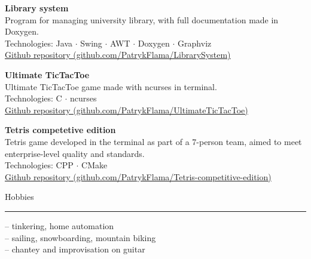 \documentclass{letter}
\begin{document}
\begin{minipage}[t]{0.70\textwidth}
\begin{tcolorbox}[colback=white, colframe=white, width=\textwidth, boxrule=0pt, sharp corners, height=\textheight, left=5mm, right=5mm, top=5mm, bottom=5mm]
{\textbf{Library system}  \\
Program for managing university library, with full documentation made in Doxygen. \\
{\small Technologies: Java $\cdot$ Swing $\cdot$ AWT $\cdot$ Doxygen $\cdot$ Graphviz } \\
{\small \href{https://github.com/PatrykFlama/LibrarySystem}{Github repository (github.com/PatrykFlama/LibrarySystem)}}

\textbf{Ultimate TicTacToe}  \\
Ultimate TicTacToe game made with ncurses in terminal. \\
{\small Technologies:  C $\cdot$ ncurses } \\
{\small \href{https://github.com/PatrykFlama/UltimateTicTacToe}{Github repository (github.com/PatrykFlama/UltimateTicTacToe)}} 

\textbf{Tetris competetive edition}  \\
Tetris game developed in the terminal as part of a 7-person team, aimed to meet enterprise-level quality and standards. \\
{\small Technologies:  CPP $\cdot$ CMake } \\
{\small \href{https://github.com/PatrykFlama/Tetris-competitive-edition}{Github repository (github.com/PatrykFlama/Tetris-competitive-edition)}} 

}


\vspace{\SectionSpacing}

{\large Hobbies}
\rule{\linewidth}{0.4pt}

{ 
-- tinkering, home automation\\
-- sailing, snowboarding, mountain biking\\
-- chantey and improvisation on guitar

}


\vfill
\vspace{-0.2cm}
\let\thefootnote\relax{}

\end{tcolorbox}
\end{minipage}
\end{document}
